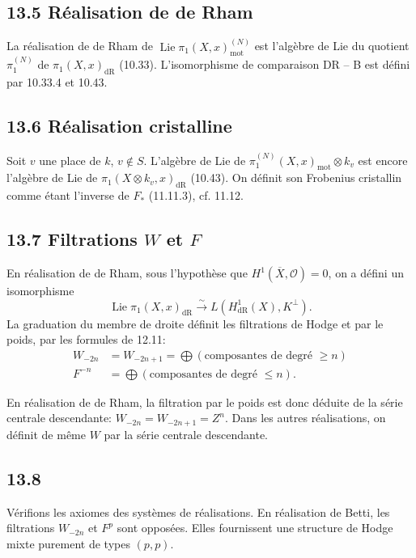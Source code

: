 \documentclass[12pt,a4paper]{article}
\theoremstyle{plain}
\theoremstyle{definition}
\theoremstyle{remark}
\DeclareMathOperator{\Lie}{Lie}
\newcommand{\cO}{\mathcal{O}}
\newcommand{\dr}{\mathrm{dR}}
\newcommand{\mot}{\mathrm{mot}}
\begin{document}
\subsection*{13.5 Réalisation de de Rham}

La réalisation de de Rham de $\Lie \pi_1(X,x)_{\mot}^{(N)}$ est l'algèbre de Lie du quotient $\pi_1^{(N)}$ de $\pi_1(X,x)_{\dr}$ (10.33). L'isomorphisme de comparaison DR -- B est défini par 10.33.4 et 10.43.

\subsection*{13.6 Réalisation cristalline}

Soit $v$ une place de $k$, $v \notin S$. L'algèbre de Lie de $\pi_1^{(N)}(X,x)_{\mot} \otimes k_v$ est encore l'algèbre de Lie de $\pi_1(X \otimes k_v, x)_{\dr}$ (10.43). On définit son Frobenius cristallin comme étant l'inverse de $F_*$ (11.11.3), cf. 11.12.

\subsection*{13.7 Filtrations $W$ et $F$}

En réalisation de de Rham, sous l'hypothèse que $H^1(\overline{X}, \cO) = 0$, on a défini un isomorphisme
\[
\Lie \pi_1(X,x)_{\dr} \xrightarrow{\sim} L(H_{\dr}^1(X), K^\perp).
\]
La graduation du membre de droite définit les filtrations de Hodge et par le poids, par les formules de 12.11:
\begin{align*}
W_{-2n} &= W_{-2n+1} = \textstyle\bigoplus (\text{composantes de degré } \geqslant n) \\
F^{-n} &= \textstyle\bigoplus (\text{composantes de degré } \leqslant n).
\end{align*}

En réalisation de de Rham, la filtration par le poids est donc déduite de la série centrale descendante: $W_{-2n} = W_{-2n+1} = Z^n$. Dans les autres réalisations, on définit de même $W$ par la série centrale descendante.

\subsection*{13.8}

Vérifions les axiomes des systèmes de réalisations. En réalisation de Betti, les filtrations $W_{-2n}$ et $F^p$ sont opposées. Elles fournissent une structure de Hodge mixte purement de types $(p,p)$.
\end{document}
